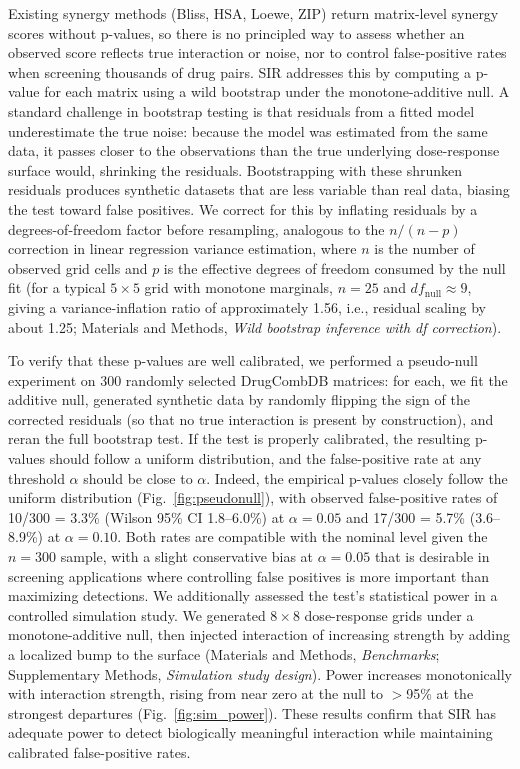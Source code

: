 \documentclass[unnumsec,webpdf,contemporary,large]{oup-authoring-template}
\begin{document}
Existing synergy methods (Bliss, HSA, Loewe, ZIP) return matrix-level synergy scores without p-values, so there is no principled way to assess whether an observed score reflects true interaction or noise, nor to control false-positive rates when screening thousands of drug pairs.
SIR addresses this by computing a p-value for each matrix using a wild bootstrap \cite{Wu1986,Mammen1993} under the monotone-additive null.
A standard challenge in bootstrap testing is that residuals from a fitted model underestimate the true noise: because the model was estimated from the same data, it passes closer to the observations than the true underlying dose-response surface would, shrinking the residuals.
Bootstrapping with these shrunken residuals produces synthetic datasets that are less variable than real data, biasing the test toward false positives.
We correct for this by inflating residuals by a degrees-of-freedom factor before resampling, analogous to the $n/(n-p)$ correction in linear regression variance estimation, where $n$ is the number of observed grid cells and $p$ is the effective degrees of freedom consumed by the null fit (for a typical $5\times 5$ grid with monotone marginals, $n=25$ and $df_{\mathrm{null}}\approx 9$, giving a variance-inflation ratio of approximately 1.56, i.e., residual scaling by about 1.25; Materials and Methods, \emph{Wild bootstrap inference with df correction}).

To verify that these p-values are well calibrated, we performed a pseudo-null experiment on 300 randomly selected DrugCombDB matrices: for each, we fit the additive null, generated synthetic data by randomly flipping the sign of the corrected residuals (so that no true interaction is present by construction), and reran the full bootstrap test.
If the test is properly calibrated, the resulting p-values should follow a uniform distribution, and the false-positive rate at any threshold $\alpha$ should be close to $\alpha$.
Indeed, the empirical p-values closely follow the uniform distribution (Fig.~\ref{fig:pseudonull}), with observed false-positive rates of 10/300 = 3.3\% (Wilson 95\% CI 1.8--6.0\%) at $\alpha=0.05$ and 17/300 = 5.7\% (3.6--8.9\%) at $\alpha=0.10$.
Both rates are compatible with the nominal level given the $n=300$ sample, with a slight conservative bias at $\alpha=0.05$ that is desirable in screening applications where controlling false positives is more important than maximizing detections.
We additionally assessed the test's statistical power in a controlled simulation study.
We generated $8\times 8$ dose-response grids under a monotone-additive null, then injected interaction of increasing strength by adding a localized bump to the surface (Materials and Methods, \emph{Benchmarks}; Supplementary Methods, \emph{Simulation study design}).
Power increases monotonically with interaction strength, rising from near zero at the null to $>$95\% at the strongest departures (Fig.~\ref{fig:sim_power}).
These results confirm that SIR has adequate power to detect biologically meaningful interaction while maintaining calibrated false-positive rates.
\end{document}
